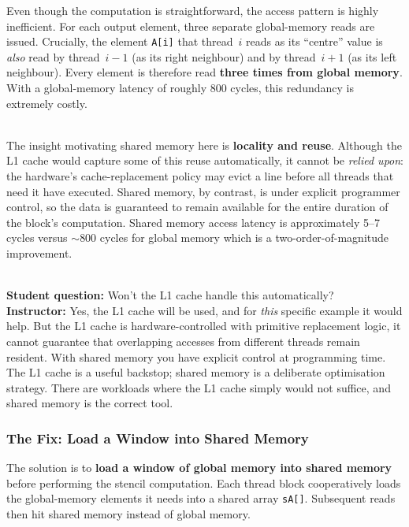 Even though the computation is straightforward, the access pattern is highly
inefficient. For each output element, three separate global-memory reads are
issued. Crucially, the element \texttt{A[i]} that thread~$i$ reads as its
``centre'' value is \emph{also} read by thread~$i-1$ (as its right neighbour)
and by thread~$i+1$ (as its left neighbour). Every element is therefore read
\textbf{three times from global memory}. With a global-memory latency of
roughly 800 cycles, this redundancy is extremely costly.
 
\begin{ppkey}
  \\The insight motivating shared memory here is \textbf{locality and reuse}.
  Although the L1 cache would capture some of this reuse automatically, it
  cannot be \emph{relied upon}: the hardware's cache-replacement policy may
  evict a line before all threads that need it have executed. Shared memory,
  by contrast, is under explicit programmer control, so the data is guaranteed
  to remain available for the entire duration of the block's computation.
  Shared memory access latency is approximately 5--7 cycles versus
  $\sim$800 cycles for global memory which is a two-order-of-magnitude improvement.
\end{ppkey}
 
\begin{ppnote}
  \\\textbf{Student question:} Won't the L1 cache handle this automatically?\\[4pt]
  \textbf{Instructor:} Yes, the L1 cache will be used, and for \emph{this}
  specific example it would help. But the L1 cache is hardware-controlled with
  primitive replacement logic, it cannot guarantee that overlapping accesses
  from different threads remain resident. With shared memory you have explicit
  control at programming time. The L1 cache is a useful backstop; shared
  memory is a deliberate optimisation strategy. There are workloads where the
  L1 cache simply would not suffice, and shared memory is the correct tool.
\end{ppnote}
 
\subsubsection{The Fix: Load a Window into Shared Memory}
 
The solution is to \textbf{load a window of global memory into shared memory}
before performing the stencil computation. Each thread block cooperatively
loads the global-memory elements it needs into a shared array
\texttt{sA[]}. Subsequent reads then hit shared memory instead of global
memory.
 
